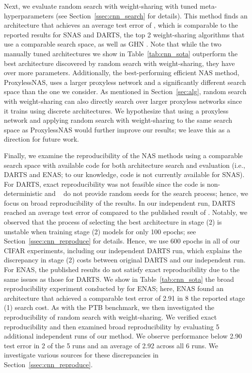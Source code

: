 \documentclass[acmlarge, nonacm]{acmart}
\begin{document}
Next, we evaluate random search with weight-sharing with tuned meta-hyperparameters (see Section~\ref{ssec:cnn_search} for details).
This method finds an architecture that achieves an average test error of , which is comparable to the reported results for SNAS and DARTS, the top 2 weight-sharing algorithms that use a comparable search space, as well as GHN \citep{zhang2018graph}.  Note that while the two manually tuned architectures we show in Table~\ref{tab:cnn_sota} outperform the best architecture discovered by random search with weight-sharing, they have over  more parameters.  Additionally, the best-performing efficient NAS method, ProxylessNAS, uses a larger proxyless network and a significantly different search space than the one we consider.
As mentioned in Section~\ref{sec:alg}, random search with weight-sharing can also directly search over larger proxyless networks since it trains using discrete architectures. We hypothesize that using a proxyless network and applying random search with weight-sharing to the same search space as ProxylessNAS would further improve our results; we leave this as a direction for future work. 

Finally, we examine the reproducibility of the NAS methods using a comparable search space with available code for both architecture search and evaluation (i.e., DARTS and ENAS; to our knowledge, code is not currently available for SNAS).
For DARTS, exact reproducibility was not feasible since the code is non-deterministic and ~\citet{liu2018darts} do not provide random seeds for the search process; hence, we focus on broad reproducibility of the results.  In our independent run, DARTS reached an average test error of  compared to the published result of .  Notably, we observed that the process of selecting the best architecture in stage (2) is unstable when training stage (2) models for only 100 epochs; see Section~\ref{ssec:cnn_reproduce} for details. Hence, we use 600 epochs in all of our CIFAR experiments, including our independent DARTS run, which explains the discrepancy in stage (2) costs between original DARTS and our independent run.
For ENAS, the published results do not satisfy exact reproducibility due to the same issues as those for DARTS.  
We show in Table~\ref{tab:cnn_sota} the broad reproducibility experiment conducted by \citet{liu2018darts} for ENAS; here, ENAS found an architecture that achieved a comparable test error of 2.91 in 8 the reported stage (1) search cost.
As with the PTB benchmark, we then investigated the reproducibility of random search with weight-sharing. 
We verified exact reproducibility and then examined broad reproducibility by evaluating 5 additional independent runs of our method. We observe performance below 2.90 test error in 2 of the 5 runs and an average of 2.92 across all 6 runs. We investigate various sources for these discrepancies in Section~\ref{ssec:cnn_reproduce}.  
\end{document}
